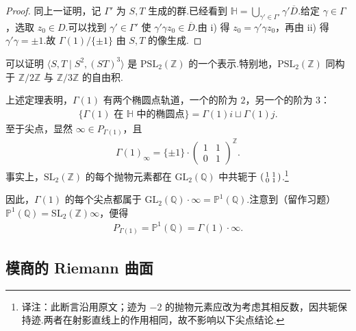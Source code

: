 \begin{proof}

同上一证明，记 $\Gamma'$ 为 $S,T$ 生成的群.已经看到 $\mathbb H=\bigcup_{\gamma'\in\Gamma'}\gamma'\overline D$.给定 $\gamma\in\Gamma$，选取 $z_0\in D$.可以找到 $\gamma'\in\Gamma'$ 使 $\gamma'\gamma z_0\in\overline D$.由 i) 得 $z_0=\gamma'\gamma z_0$，再由 ii) 得 $\gamma'\gamma=\pm1$.故 $\Gamma(1)/\{\pm1\}$ 由 $S,T$ 的像生成.

\end{proof}

\begin{remark*}

可以证明 $\langle S,T\mid S^2,(ST)^3\rangle$ 是 $\mathrm{PSL}_2(\mathbb Z)$ 的一个表示.特别地，$\mathrm{PSL}_2(\mathbb Z)$ 同构于 $\mathbb Z/2\mathbb Z$ 与 $\mathbb Z/3\mathbb Z$ 的自由积.

\end{remark*}

上述定理表明，$\Gamma(1)$ 有两个椭圆点轨道，一个的阶为 $2$，另一个的阶为 $3$：
\begin{align*}
\{\Gamma(1)\text{ 在 }\mathbb H\text{ 中的椭圆点}\}=\Gamma(1)i\sqcup\Gamma(1)j.
\end{align*}
至于尖点，显然 $\infty\in P_{\Gamma(1)}$，且
\begin{align*}
\Gamma(1)_\infty=\{\pm1\}\cdot\begin{pmatrix}1&1\\0&1\end{pmatrix}^{\mathbb Z}.
\end{align*}
事实上，$\mathrm{SL}_2(\mathbb Z)$ 的每个抛物元素都在 $\mathrm{GL}_2(\mathbb Q)$ 中共轭于 $\begin{psmallmatrix}1&1\\0&1\end{psmallmatrix}$.\footnote{译注：此断言沿用原文；迹为 $-2$ 的抛物元素应改为考虑其相反数，因共轭保持迹.两者在射影直线上的作用相同，故不影响以下尖点结论.}

因此，$\Gamma(1)$ 的每个尖点都属于 $\mathrm{GL}_2(\mathbb Q)\cdot\infty=\mathbb P^1(\mathbb Q)$.注意到（留作习题）$\mathbb P^1(\mathbb Q)=\mathrm{SL}_2(\mathbb Z)\infty$，便得
\begin{align*}
P_{\Gamma(1)}=\mathbb P^1(\mathbb Q)=\Gamma(1)\cdot\infty.
\end{align*}
\subsection{模商的 Riemann 曲面}\label{sec:modular-1-1-6}

